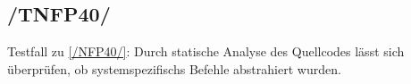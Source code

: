 \subsection*{/TNFP40/}

\label{/TNFP40/} Testfall zu \ref{/NFP40/}: Durch \gls{statische Analyse} des \Gls{Quellcode}s lässt sich überprüfen, ob \glspl{systemspezifisch} Befehle abstrahiert wurden.